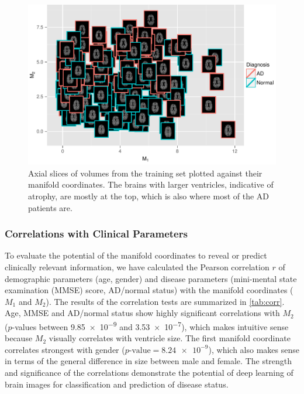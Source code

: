 \begin{figure}[tb!] \centering
\includegraphics[width=\textwidth]{figures/scatterimage}
\caption[Axial slices of volumes from the training set plotted against their
manifold coordinates]{Axial slices of volumes from the training set plotted
against their manifold coordinates. The brains with larger ventricles, indicative of atrophy,
are mostly at the top, which is also where most of the AD patients are.}
\label{fig:scatter}
\end{figure}

\subsubsection{Correlations with Clinical Parameters}

To evaluate the potential of the manifold coordinates to reveal or predict
clinically relevant information, we have calculated the Pearson correlation $r$
of demographic parameters (age, gender) and disease parameters (mini-mental
state examination (MMSE) score, AD/normal status) with the manifold coordinates
($M_1$ and $M_2$). The results of the correlation tests are summarized in
\ref{tab:corr}. Age, MMSE and AD/normal status show highly significant
correlations with $M_2$ ($p$-values between \num{9.85e-9} and \num{3.53e-7}),
which makes intuitive sense because $M_2$ visually correlates with ventricle
size. The first manifold coordinate correlates strongest with gender
($p\text{-value} = \num{8.24e-9}$), which also makes sense in terms of the
general difference in size between male and female. The strength and
significance of the correlations demonstrate the potential of deep learning of
brain images for classification and prediction of disease status.

